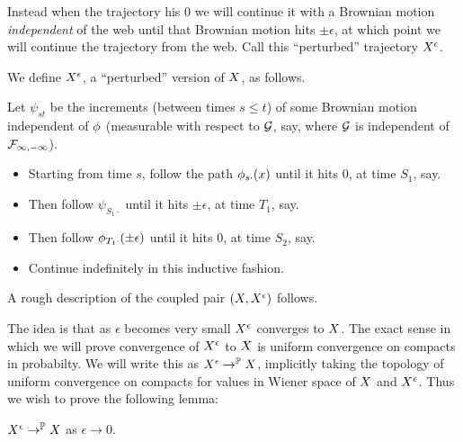 {Instead when the trajectory his $0$ we will continue it with a
Brownian motion \emph{independent} of the web until that Brownian
motion hits $\pm\epsilon$, at which point we will continue the
trajectory from the web.  Call this ``perturbed'' trajectory
$X^{\epsilon}$.

{
\newcommand{\joinernoargs}{\psi}
\newcommand{\joiner}[2]{\joinernoargs_{{#1}{#2}}}
\begin{definition}
  We define $X^{\epsilon}$, a ``perturbed'' version of $X$, as
  follows.

  Let $\joiner{s}{t}$ be the increments (between times $s \le t$) of
  some Brownian motion independent of $\phi$ (measurable with
  respect to $\mathcal{G}$, say, where $\mathcal{G}$ is independent of
  $\mathcal{F}_{\infty,-\infty}$).

  \begin{itemize}
  \item Starting from time $s$, follow the path $\phi_{{s}{\cdot}}(x)$
    until it hits $0$, at time $S_1$, say.
  \item Then follow $\joiner{S_1}{\cdot}$ until it hits $\pm \epsilon$, at
    time $T_1$, say.
  \item Then follow $\phi_{{T_1}{\cdot}}(\pm \epsilon)$ until it hits $0$, at
    time $S_2$, say.
  \item Continue indefinitely in this inductive fashion.
  \end{itemize}
\end{definition}
}

\begin{obs}
  \label{obs:2d-proc}
  A rough description of the coupled pair $(X, X^{\epsilon})$
  follows.

\end{obs}

The idea is that as $\epsilon$ becomes very small $X^{\epsilon}$
converges to $X$.
The exact sense in which we will prove convergence of $X^{\epsilon}$ to
$X$ is uniform convergence on compacts in probabilty.  We will
write this as $X^{\epsilon} \to^{\mathbb{P}} X$, implicitly taking the
topology of uniform convergence on compacts for values in Wiener space
of $X$ and $X^{\epsilon}$.  Thus we wish to prove the following
lemma:

\begin{lemma}
  \label{lem:resamplede-to-sampled}
  $X^{\epsilon} \to^{\mathbb{P}} X$ as $\epsilon \to 0$.
\end{lemma}

}
